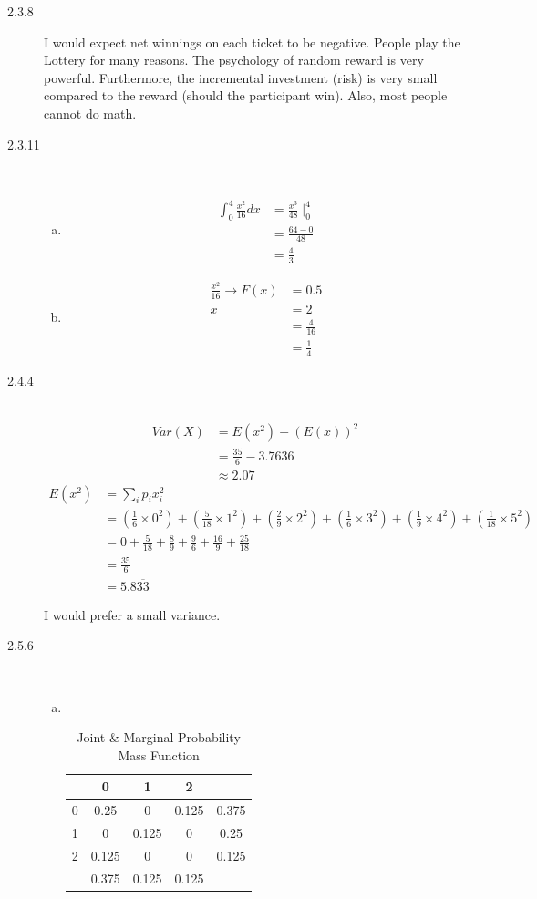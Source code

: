 \documentclass[letterpaper,10pt]{article}
\begin{document}
\begin{description}
\item[2.3.8] I would expect net winnings on each ticket to be negative.  People play the Lottery for many reasons.  The psychology of random reward is very powerful.  Furthermore, the incremental investment (risk) is very small compared to the reward (should the participant win).  Also, most people cannot do math.

\item[2.3.11] \  
\begin{enumerate}[a)]
\item\begin{align*}
\int_{0}^{4} \frac{x^{2}}{16}dx &= \frac{x^{3}}{48} \mid_{0}^{4} \\
&= \frac{64-0}{48} \\
&= \frac{4}{3}
\end{align*}
\item\begin{align*}
\frac{x^{2}}{16} \rightarrow
F(x) &= 0.5 \\ 
x &= 2 \\
&= \frac{4}{16} \\
&= \frac{1}{4}
\end{align*}
\end{enumerate}

\item[2.4.4] \ 
\begin{align*}
Var(X) &= E(x^{2}) - (E(x))^{2} \\
&= \frac{35}{6} - 3.7636 \\
&\approx 2.07
\end{align*}
\begin{align*}
E(x^{2}) &= \sum_{i} p_{i}x^{2}_{i} \\
&= (\frac{1}{6}\times 0^{2}) + (\frac{5}{18}\times 1^{2}) + (\frac{2}{9}\times 2^{2}) + (\frac{1}{6}\times 3^{2}) + (\frac{1}{9}\times 4^{2}) + (\frac{1}{18}\times 5^{2}) \\
&= 0+\frac{5}{18}+\frac{8}{9}+\frac{9}{6}+\frac{16}{9}+\frac{25}{18} \\
&= \frac{35}{6} \\
&= 5.8\overline{33}
\end{align*}

I would prefer a small variance.

\item[2.5.6] \ 
\begin{enumerate}[a)]
\item \ 
\begin{table}[htdp]
\caption{Joint \& Marginal Probability Mass Function}
\begin{center}
\begin{tabular}{c|c|c|c|c}
 & 0 & 1 & 2 \\ \hline
 0 & 0.25 & 0 & 0.125 & 0.375 \\ \hline
 1 & 0 & 0.125 & 0 & 0.25\\ \hline
 2 & 0.125 & 0 & 0 & 0.125 \\ \hline
 & 0.375 & 0.125 & 0.125
\end{tabular}
\end{center}
\label{default}
\end{table}


\end{enumerate}
\end{description}
\end{document}
